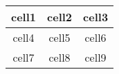 \begin{tabular}{ c c c }
    \toprule
    cell1 & cell2 & cell3 \\
    \midrule
    cell4 & cell5 & cell6 \\  
    cell7 & cell8 & cell9 \\
    \bottomrule 
\end{tabular}
